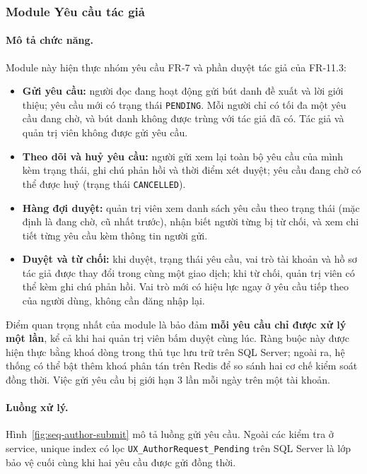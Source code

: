 \subsubsection{Module Yêu cầu tác giả}
\label{subsubsec:feature-author-request}

\paragraph{Mô tả chức năng.} Module này hiện thực nhóm yêu cầu FR-7 và phần duyệt tác giả của FR-11.3:
\begin{itemize}
    \item \textbf{Gửi yêu cầu:} người đọc đang hoạt động gửi bút danh đề xuất và lời giới thiệu; yêu cầu mới có trạng thái \texttt{PENDING}. Mỗi người chỉ có tối đa một yêu cầu đang chờ, và bút danh không được trùng với tác giả đã có. Tác giả và quản trị viên không được gửi yêu cầu.
    \item \textbf{Theo dõi và huỷ yêu cầu:} người gửi xem lại toàn bộ yêu cầu của mình kèm trạng thái, ghi chú phản hồi và thời điểm xét duyệt; yêu cầu đang chờ có thể được huỷ (trạng thái \texttt{CANCELLED}).
    \item \textbf{Hàng đợi duyệt:} quản trị viên xem danh sách yêu cầu theo trạng thái (mặc định là đang chờ, cũ nhất trước), nhận biết người từng bị từ chối, và xem chi tiết từng yêu cầu kèm thông tin người gửi.
    \item \textbf{Duyệt và từ chối:} khi duyệt, trạng thái yêu cầu, vai trò tài khoản và hồ sơ tác giả được thay đổi trong cùng một giao dịch; khi từ chối, quản trị viên có thể kèm ghi chú phản hồi. Vai trò mới có hiệu lực ngay ở yêu cầu tiếp theo của người dùng, không cần đăng nhập lại.
\end{itemize}
Điểm quan trọng nhất của module là bảo đảm \textbf{mỗi yêu cầu chỉ được xử lý một lần}, kể cả khi hai quản trị viên bấm duyệt cùng lúc. Ràng buộc này được hiện thực bằng khoá dòng trong thủ tục lưu trữ trên SQL Server; ngoài ra, hệ thống có thể bật thêm khoá phân tán trên Redis để so sánh hai cơ chế kiểm soát đồng thời. Việc gửi yêu cầu bị giới hạn 3 lần mỗi ngày trên một tài khoản.

\paragraph{Luồng xử lý.} Hình~\ref{fig:seq-author-submit} mô tả luồng gửi yêu cầu. Ngoài các kiểm tra ở service, unique index có lọc \texttt{UX\_AuthorRequest\_Pending} trên SQL Server là lớp bảo vệ cuối cùng khi hai yêu cầu được gửi đồng thời.


